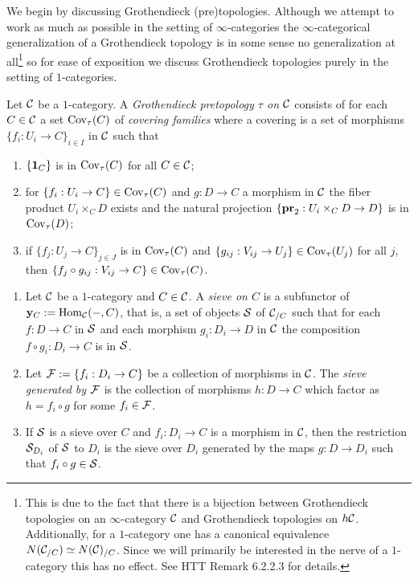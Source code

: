 \documentclass[12pt]{article}
\numberwithin{equation}{section}
\numberwithin{lemma}{section}
\numberwithin{theorem}{section}
\numberwithin{proposition}{section}
\numberwithin{corollary}{section}
\numberwithin{definition}{section}
\numberwithin{example}{section}
\numberwithin{remark}{section}
\begin{document}
We begin by discussing Grothendieck (pre)topologies. Although we
attempt to work as much as possible in the setting of
$\infty$-categories the $\infty$-categorical generalization of a
Grothendieck topology is in some sense no generalization at
all\footnote{This is due to the fact that there is a bijection between
  Grothendieck topologies on an $\infty$-category $\CC$ and
  Grothendieck topologies on $h\CC$. Additionally, for a $1$-category
  one has a canonical equivalence $N(\CC_{/C}) \simeq
  N(\CC)_{/C}$. Since we will primarily be interested in the nerve of
  a $1$-category this has no effect. See HTT Remark 6.2.2.3 for
  details.} so for ease of exposition we discuss Grothendieck
topologies purely in the setting of $1$-categories.

\begin{definition}
  Let $\CC$ be a $1$-category. A \emph{Grothendieck pretopology $\tau$
    on $\CC$} consists of for each $C \in \CC$ a set $\Cov_{\tau}(C)$
  of \emph{covering families} where a covering is a set of morphisms
  $\{f_i : U_i \to C\}_{i \in I}$ in $\CC$ such that
  \begin{enumerate}[label=(\arabic*)]
  \item $\{\id[C]\}$ is in $\Cov_{\tau}(C)$ for all $C \in \CC$;
  \item for $\{f_i : U_i \to C\} \in \Cov_{\tau}(C)$ and $g : D \to C$
    a morphism in $\CC$ the fiber product $U_i \times_C D$ exists and
    the natural projection $\{\pr[2] : U_i \times_C D \to D\}$ is in
    $\Cov_{\tau}(D)$;
  \item if $\{f_j : U_j \to C\}_{j \in J}$ is in $\Cov_{\tau}(C)$ and
    $\{g_{ij} : V_{ij} \to U_j\} \in \Cov_{\tau}(U_j)$ for all $j$,
    then $\{f_j \circ g_{ij} : V_{ij} \to C\} \in \Cov_{\tau}(C)$.
  \end{enumerate}
\end{definition}

\begin{definition}
  \begin{enumerate}[label=(\arabic*)]
  \item Let $\CC$ be a $1$-category and $C \in \CC$. A \emph{sieve on
      $C$} is a subfunctor of $\y_C := \Hom_{\CC}(-, C)$, that is, a
    set of objects $\SS$ of $\CC_{/C}$ such that for each
    $f : D \to C$ in $\SS$ and each morphism $g_i : D_i \to D$ in
    $\CC$ the composition $f \circ g_i : D_i \to C$ is in $\SS$.
  \item Let $\FF := \{f_i : D_i \to C\}$ be a collection of morphisms
    in $\CC$. The \emph{sieve generated by $\FF$} is the collection of
    morphisms $h : D \to C$ which factor as $h = f_i \circ g$ for some
    $f_i \in \FF$.
  \item If $\SS$ is a sieve over $C$ and $f_i : D_i \to C$ is a
    morphism in $\CC$, then the restriction $\SS_{D_i}$ of $\SS$ to
    $D_i$ is the sieve over $D_i$ generated by the maps
    $g : D \to D_i$ such that $f_i \circ g \in \SS$.
  \end{enumerate}
\end{definition}
\end{document}
